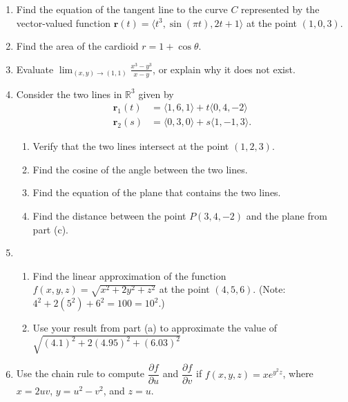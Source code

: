 \documentclass[12pt]{article}
\newcommand{\points}[1]{\marginpar{\hspace{24pt}[#1]}}
\newcommand{\di}{\displaystyle}
\newcommand{\R}{\mathbb{R}}
\begin{document}
\begin{enumerate}
\item Find the equation of the tangent line to the curve $C$ represented by the vector-valued function $\mathbf{r}(t) = \langle t^3, \sin(\pi t), 2t+1\rangle$ at the point $(1,0,3)$.\points{4}

\vspace{2.5in}

\item Find the area of the cardioid $r=1+\cos\theta$. \points{5}

\vspace{3in}

\item Evaluate $\di \lim_{(x,y)\to (1,1)}\frac{x^3-y^3}{x-y}$, or explain why it does not exist. \points{3}
\newpage

\item Consider the two lines in $\R^3$ given by
\begin{align*}
\mathbf{r}_1(t) & = \langle 1,6,1\rangle + t\langle 0,4,-2\rangle\\
\mathbf{r}_2(s) & = \langle 0,3,0\rangle +s\langle 1,-1,3\rangle.
\end{align*}
\begin{enumerate}
\item Verify that the two lines intersect at the point $(1,2,3)$. \points{2}

\vspace{1.2in}

\item Find the cosine of the angle between the two lines. \points{3}

\vspace{1.3in}

\item Find the equation of the plane that contains the two lines. \points{4}

\vspace{2.2in}

\item Find the distance between the point $P(3,4,-2)$ and the plane from part (c).\points{3}
\end{enumerate}
\newpage


\item \begin{enumerate}
\item Find the linear approximation of the function $f(x,y,z)=\sqrt{x^2+2y^2+z^2}$ at the point $(4,5,6)$. (Note: $4^2+2(5^2)+6^2 = 100 = 10^2$.) \points{5}

\vspace{2.75in}

\item Use your result from part (a) to approximate the value of $\sqrt{(4.1)^2+2(4.95)^2+(6.03)^2}$ \points{2}

\vspace{1.7in}
\end{enumerate} 



\item Use the chain rule to compute $\dfrac{\partial f}{\partial u}$ and $\dfrac{\partial f}{\partial v}$ if $\di f(x,y,z) = xe^{y^2z}$, where $x = 2uv$, $y=u^2-v^2$, and $z=u$. \points{5}
\end{enumerate}
\end{document}
